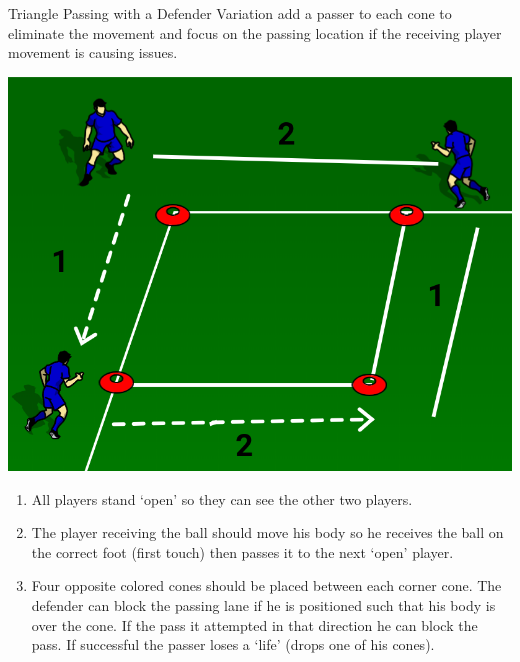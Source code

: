 \begin{evenBlock}{Triangle Passing with a Defender}
        Variation add a passer to each cone to eliminate the movement and focus on the passing location if the receiving player movement is causing issues.
\begin{minipage}[t]{\linewidth}
    \begin{minipage}{.3\linewidth} %
        \centering
        \includegraphics[width=\textwidth]{../img/Trimmed/Triangle_Passing_3P_mini}
    \end{minipage}
    \hspace{0.05\linewidth}
    \begin{minipage}{.6\linewidth} %
        \begin{enumerate}
            \setlength{\itemsep}{0pt}
            \setlength{\parskip}{0pt}
            \setlength{\parsep}{0pt}
            \item All players stand `open' so they can see the other two players.
            \item The player receiving the ball should move his body so he receives the ball on the correct foot (first touch) then passes it to the next `open' player.
            \item  Four opposite colored cones should be placed between each corner cone.  The defender can block the passing lane if he is positioned such that his body is over the cone.  If the pass it attempted in that direction he can block the pass.  If successful the passer loses a `life' (drops one of his cones).
        \end{enumerate}
    \end{minipage}

\end{minipage}
\end{evenBlock}
